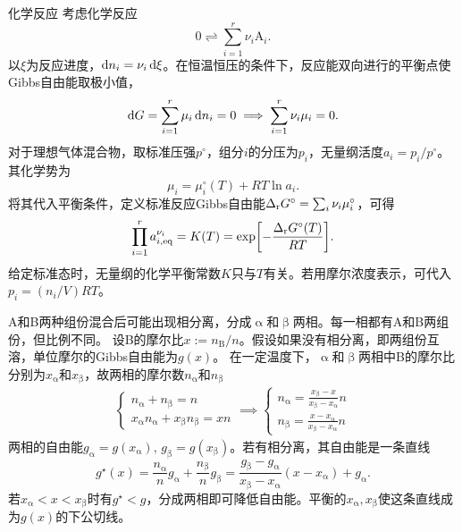 \begin{example}
	{化学反应}{}
	考虑化学反应
	\[
		0 \rightleftharpoons \sum_{i=1}^r\nu_i\mathrm{A}_i.
	\]
	以$\xi$为反应进度，$\mathop{}\!\mathrm{d} n_i = \nu_i\mathop{}\!\mathrm{d}\xi$。在恒温恒压的条件下，反应能双向进行的平衡点使Gibbs自由能取极小值，
	\begin{equation}
		\label{eq:sm-reaction-equilibrium}
		\mathop{}\!\mathrm{d} G = \sum_{i=1}^r\mu_i\mathop{}\!\mathrm{d} n_i = 0 \implies \sum_{i=1}^r\nu_i\mu_i = 0.
	\end{equation}
	对于理想气体混合物，取标准压强$p^\circ$，组分$i$的分压为$p_i$，无量纲活度$a_i = p_i/p^\circ$。其化学势为
	\begin{equation}
		\label{eq:sm-ideal-gas-activity}
		\mu_i = \mu_i^\circ(T) + RT\ln a_i .
	\end{equation}
	将其代入平衡条件，定义标准反应Gibbs自由能$\textstyle \Delta_{\rm r}G^\circ = \sum_i\nu_i\mu_i^\circ$，可得
	\begin{equation}
		\prod_{i=1}^r a_{i,\rm eq}^{\nu_i} = K(T) = \exp\biggl[-\frac{\Delta_{\rm r}G^\circ(T)}{RT}\biggr].
	\end{equation}
	给定标准态时，无量纲的化学平衡常数$K$只与$T$有关。若用摩尔浓度表示，可代入$p_i = (n_i/V)RT$。
\end{example}


A和B两种组份混合后可能出现相分离，分成$\upalpha$和$\upbeta$两相。每一相都有A和B两组份，但比例不同。%
设B的摩尔比$x := n_\mathrm{B}/n$。假设如果没有相分离，即两组份互溶，单位摩尔的Gibbs自由能为$g(x)$。
在一定温度下，$\upalpha$和$\upbeta$两相中B的摩尔比分别为$x_\upalpha$和$x_\upbeta$，故两相的摩尔数$n_\upalpha$和$n_\upbeta$%
\begin{align*}
	\begin{cases}
		n_\upalpha + n_\upbeta = n  \\
		x_\upalpha n_\upalpha + x_\upbeta n_\upbeta = xn
	\end{cases}
	\implies
	\begin{cases}
		n_\upalpha = \frac{x_\upbeta - x}{x_\upbeta - x_\upalpha}n  \\
		n_\upbeta = \frac{x - x_\upalpha}{x_\upbeta - x_\upalpha}n
	\end{cases}
\end{align*}
两相的自由能$g_\upalpha = g(x_\upalpha),\,g_\upbeta = g(x_\upbeta)$。若有相分离，其自由能是一条直线
\[
	g^\star(x) = \frac{n_\upalpha}n g_\upalpha + \frac{n_\upbeta}n g_\upbeta
	= \frac{g_\upbeta - g_\upalpha}{x_\upbeta - x_\upalpha}(x - x_\upalpha) + g_\upalpha.
\]
若$x_\upalpha < x < x_\upbeta$时有$g^\star < g$，分成两相即可降低自由能。平衡的$x_\upalpha,x_\upbeta$使这条直线成为$g(x)$的下公切线。

